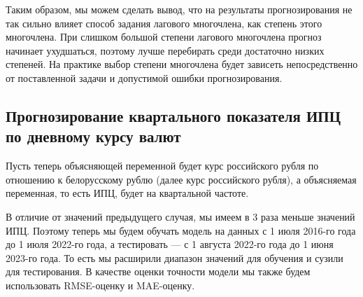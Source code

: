 \documentclass[a4paper, 12pt]{extarticle}
\begin{document}
		
		Таким образом, мы можем сделать вывод, что на результаты прогнозирования не так сильно влияет способ задания лагового многочлена, как степень этого многочлена. При слишком большой степени лагового многочлена прогноз начинает ухудшаться, поэтому лучше перебирать среди достаточно низких степеней. На практике выбор степени многочлена будет зависеть непосредственно от поставленной задачи и допустимой ошибки прогнозирования.
		
		\subsection{Прогнозирование квартального показателя ИПЦ по дневному курсу валют}
		Пусть теперь объясняющей переменной будет курс российского рубля по отношению к белорусскому рублю (далее курс российского рубля), а объясняемая переменная, то есть ИПЦ, будет на квартальной частоте.
		
		В отличие от значений предыдущего случая, мы имеем в 3 раза меньше значений ИПЦ. Поэтому теперь мы будем обучать модель на данных с 1 июля 2016-го года до 1 июля 2022-го года, а тестировать --- с 1 августа 2022-го года до 1 июня 2023-го года. То есть мы расширили диапазон значений для обучения и сузили для тестирования. В качестве оценки точности модели мы также будем использовать RMSE-оценку и MAE-оценку.
		
\end{document}

